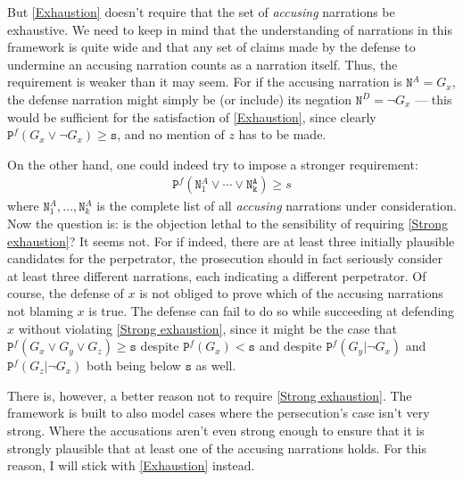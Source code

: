 \documentclass[10pt,leqno]{article}
\newcommand{\n}{\neg}
\begin{document}
But \eqref{Exhaustion} doesn't require that the set of \emph{accusing} narrations be exhaustive. We need to keep in mind that the understanding of narrations in this framework is quite wide and that any set of claims made by the defense to undermine an accusing narration counts as a narration itself. Thus, the requirement is weaker than it may seem. For if the accusing narration is $\mathtt{N}^A=G_x$, the defense narration might simply be (or include) its negation $\mathtt{N}^D=\n G_x$ --- this would be sufficient for the satisfaction of \eqref{Exhaustion}, since clearly  $\mathtt{P}^f(G_x\vee \n G_x) \geq \mathtt{s}$, and no mention of $z$ has to be made. 

On the other hand, one could indeed try to impose a stronger requirement:
\begin{align}
\tag{Strong exhaustion} \label{Strong exhaustion} \mathtt{P}^f( \mathtt{N}^A_1\vee \cdots \vee  \mathtt{N^A_k}) \geq s 
\end{align}
\noindent where $\mathtt{N}^A_1, \dots, \mathtt{N}^A_k$ is the complete list of all \emph{accusing} narrations  under consideration. Now the question is: is the objection lethal to the sensibility of requiring \eqref{Strong exhaustion}? It seems not. For if indeed, there are at least three initially plausible candidates for the perpetrator, the prosecution should in fact seriously  consider at least three different narrations, each indicating a different perpetrator. Of course, the defense of $x$ is not obliged to prove which of the accusing narrations not blaming $x$ is true. The defense can fail to do so while succeeding at defending $x$  without violating \eqref{Strong exhaustion}, since it might be the case that $\mathtt{P}^f(G_x\vee G_y \vee G_z)\geq \mathtt{s}$ despite $\mathtt{P}^f(G_x)<\mathtt{s}$ and despite $\mathtt{P}^f(G_y\vert \n G_x)$ and $\mathtt{P}^f(G_z\vert \n G_x)$ both being below $\mathtt{s}$ as well.

There is, however, a better reason not to require \eqref{Strong exhaustion}. The framework is built to also model cases where the persecution's case isn't very strong. Where the accusations aren't even strong enough to ensure that it is strongly plausible that at least one of the accusing narrations holds. For this reason, I will stick with \eqref{Exhaustion} instead.
\end{document}

